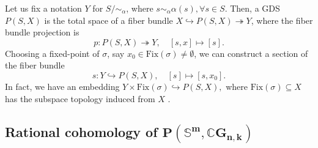 \documentclass{amsart}
\begin{document}
	Let us fix a notation $ Y $ for $ S/\!\!\sim_{\alpha} $, where $ s\sim_{\alpha} \alpha(s), \forall s\in S $. Then, a GDS $ P(S,X) $ is the total space of a fiber bundle  
	$X\hookrightarrow P(S,X) \twoheadrightarrow Y $, where the fiber bundle projection is \begin{equation}\label{proj}
		p: P(S,X) \twoheadrightarrow Y, \quad [s,x]\mapsto [s].
	\end{equation}  Choosing a fixed-point of $\sigma$, say $x_0\in \text{Fix}(\sigma)\neq \emptyset$, we can construct a section of the fiber bundle \begin{equation}\label{sectio}
		s: Y \hookrightarrow P(S,X), \quad [s]\mapsto [s,x_0].
	\end{equation}    
	In fact, we have an embedding  
	$Y\times \text{Fix}(\sigma)\hookrightarrow P(S,X),$  
	where $ \text{Fix}(\sigma) \subseteq X $ has the subspace topology induced from $ X $%
.
	
	
	
	
	
	
	\subsection{Rational cohomology of $\mathbf{P(\mathbb S^m,\mathbb CG_{n,k})}$} \label{gds}
	
\end{document}
